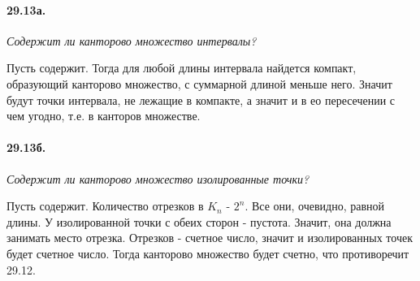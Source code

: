 \documentclass{book}
\begin{document}
\paragraph{29.13а.}
\textit{Содержит ли канторово множество интервалы?}

Пусть содержит. Тогда для любой длины интервала найдется компакт, образующий канторово множество, с суммарной длиной меньше него. Значит будут точки интервала, не лежащие в компакте, а значит и в ео пересечении с чем угодно, т.е. в канторов множестве.

\paragraph{29.13б.}
\textit{Содержит ли канторово множество изолированные точки?}

Пусть содержит. Количество отрезков в $K_n$ - $2^n$. Все они, очевидно, равной длины. У изолированной точки с обеих сторон - пустота. Значит, она должна занимать место отрезка. Отрезков - счетное число, значит и изолированных точек будет счетное число. Тогда канторово множество будет счетно, что противоречит 29.12.
\end{document}
